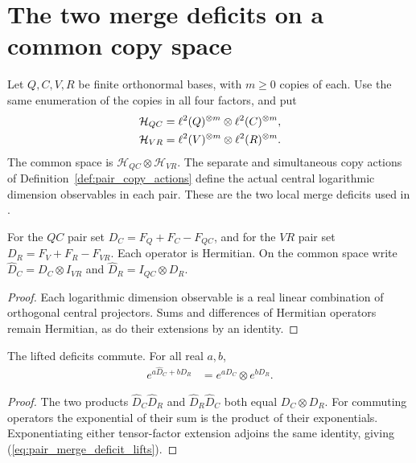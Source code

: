 \section{The two merge deficits on a common copy space}
\label{sec:pair_merge_deficit}

Let $Q,C,V,R$ be finite orthonormal bases, with $m\ge0$ copies of each.
Use the same enumeration of the copies in all four factors, and put
\begin{align}
 \mathcal H_{QC}&=\ell^2(Q)^{\otimes m}\otimes\ell^2(C)^{\otimes m},\notag\\
 \mathcal H_{VR}&=\ell^2(V)^{\otimes m}\otimes\ell^2(R)^{\otimes m}.\notag
\end{align}
The common space is $\mathcal H_{QC}\otimes\mathcal H_{VR}$.
The separate and simultaneous copy actions of
Definition~\ref{def:pair_copy_actions} define the actual central
logarithmic dimension observables in each pair. These are the two local
merge deficits used in \cite[Section~7]{OpenAI2026AreaLaw}.

\begin{definition}
\label{def:pair_merge_deficit}
\leanok
{}
For the $QC$ pair set $D_C=F_Q+F_C-F_{QC}$, and for the $VR$ pair set
$D_R=F_V+F_R-F_{VR}$. Each operator is Hermitian. On the common space
write $\widehat D_C=D_C\otimes I_{VR}$ and
$\widehat D_R=I_{QC}\otimes D_R$.
\end{definition}
\begin{proof}
\leanok
Each logarithmic dimension observable is a real linear combination of
orthogonal central projectors. Sums and differences of Hermitian
operators remain Hermitian, as do their extensions by an identity.
\end{proof}

\begin{theorem}
\label{thm:pair_merge_deficit_lifts}
\leanok
{}
The lifted deficits commute. For all real $a,b$,
\begin{align}
 e^{a\widehat D_C+b\widehat D_R}
 &=e^{aD_C}\otimes e^{bD_R}.
 \label{eq:pair_merge_deficit_lifts}
\end{align}
\end{theorem}
\begin{proof}
\leanok
The two products $\widehat D_C\widehat D_R$ and
$\widehat D_R\widehat D_C$ both equal $D_C\otimes D_R$.
For commuting operators the exponential of their sum is the product of
their exponentials. Exponentiating either tensor-factor extension
adjoins the same identity, giving (\ref{eq:pair_merge_deficit_lifts}).
\end{proof}

